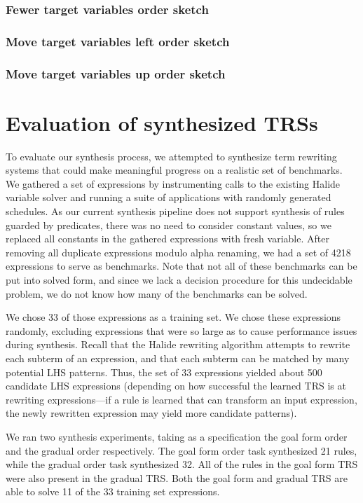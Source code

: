 \subsubsection{Fewer target variables order sketch}

\subsubsection{Move target variables left order sketch}

\subsubsection{Move target variables up order sketch}

\section{Evaluation of synthesized TRSs}
\label{sec:varsolvereval}

To evaluate our synthesis process, we attempted to synthesize term rewriting systems that could make meaningful progress on a realistic set of benchmarks. We gathered a set of expressions by instrumenting calls to the existing Halide variable solver and running a suite of applications with randomly generated schedules. As our current synthesis pipeline does not support synthesis of rules guarded by predicates, there was no need to consider constant values, so we replaced all constants in the gathered expressions with fresh variable. After removing all duplicate expressions modulo alpha renaming, we had a set of 4218 expressions to serve as benchmarks. Note that not all of these benchmarks can be put into solved form, and since we lack a decision procedure for this undecidable problem, we do not know how many of the benchmarks can be solved.

We chose 33 of those expressions as a training set. We chose these expressions randomly, excluding expressions that were so large as to cause performance issues during synthesis. Recall that the Halide rewriting algorithm attempts to rewrite each subterm of an expression, and that each subterm can be matched by many potential LHS patterns. Thus, the set of 33 expressions yielded about 500 candidate LHS expressions (depending on how successful the learned TRS is at rewriting expressions---if a rule is learned that can transform an input expression, the newly rewritten expression may yield more candidate patterns).

We ran two synthesis experiments, taking as a specification the goal form order and the gradual order respectively. The goal form order task synthesized 21 rules, while the gradual order task synthesized 32. All of the rules in the goal form TRS were also present in the gradual TRS. Both the goal form and gradual TRS are able to solve 11 of the 33 training set expressions. 

